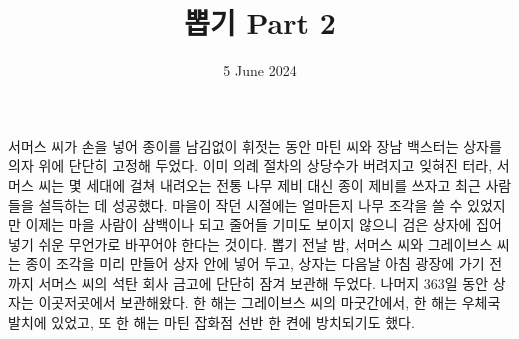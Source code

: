 \documentclass{translation}
\date{5 June 2024}
\title{뽑기 Part 2}
\begin{document}
서머스 씨가 손을 넣어 종이를 남김없이 휘젓는 동안 마틴 씨와 장남 백스터는 상자를 의자 위에 단단히 고정해 두었다.
이미 의례 절차의 상당수가 버려지고 잊혀진 터라, 서머스 씨는 몇 세대에 걸쳐 내려오는 전통 나무 제비 대신 종이 제비를 쓰자고 최근 사람들을 설득하는 데 성공했다.
마을이 작던 시절에는 얼마든지 나무 조각을 쓸 수 있었지만 이제는 마을 사람이 삼백이나 되고 줄어들 기미도 보이지 않으니 검은 상자에 집어넣기 쉬운 무언가로 바꾸어야 한다는 것이다.
뽑기 전날 밤, 서머스 씨와 그레이브스 씨는 종이 조각을 미리 만들어 상자 안에 넣어 두고, 상자는 다음날 아침 광장에 가기 전까지 서머스 씨의 석탄 회사 금고에 단단히 잠겨 보관해 두었다.
나머지 363일 동안 상자는 이곳저곳에서 보관해왔다.
한 해는 그레이브스 씨의 마굿간에서, 한 해는 우체국 발치에 있었고, 또 한 해는 마틴 잡화점 선반 한 켠에 방치되기도 했다.
% 
\end{document}
